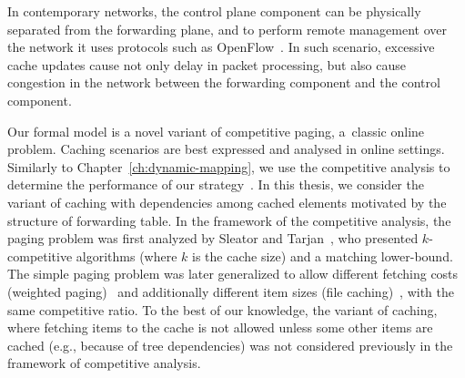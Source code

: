 



In contemporary networks, the control plane component can be physically separated from the forwarding plane, and to perform remote management over the network it uses protocols such as OpenFlow~\cite{openflow}.
In such scenario, excessive cache updates cause not only delay in packet processing, but also cause congestion in the network between the forwarding component and the control component.

Our formal model is a novel variant of competitive paging, a~classic online
problem.
Caching scenarios are best expressed and analysed in online settings.
Similarly to Chapter~\ref{ch:dynamic-mapping}, we use the competitive analysis to determine the performance of our strategy~\cite{borodin-book}.
In this thesis, we consider the variant of caching with dependencies among cached elements motivated by the structure of forwarding table.
In the framework of the competitive analysis, the paging problem was
first analyzed  by Sleator and Tarjan~\cite{competitive-analysis}, who presented $k$-competitive algorithms (where $k$ is the cache size) and a matching lower-bound.
The simple paging problem was later generalized to allow different fetching
costs (weighted paging)~\cite{double-coverage,young-paging-greedy-dual} and
additionally different item sizes (file caching)~\cite{young-paging-landlord},
with the same competitive ratio.
To the best of our knowledge, the variant of caching, where fetching items to
the cache is not allowed unless some other items are cached (e.g., because of 
tree dependencies) was 
not considered previously in the framework of competitive analysis.




